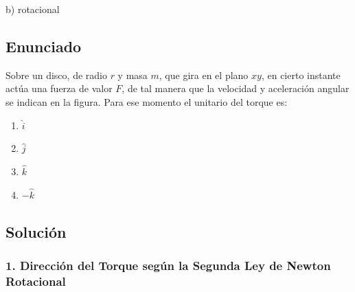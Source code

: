 \documentclass[12pt, a4paper]{article}
\begin{document}
\begin{tcolorbox}[colback=green!5!white, colframe=green!50!black, title=Respuesta Final]
\centering \Large b) rotacional
\end{tcolorbox}

\newpage

\subsection*{Enunciado}
Sobre un disco, de radio $r$ y masa $m$, que gira en el plano $xy$, en cierto instante actúa una fuerza de valor $F$, de tal manera que la velocidad y aceleración angular se indican en la figura. Para ese momento el unitario del torque es:

\begin{center}
\end{center}

\begin{enumerate}[label=\alph*)]
    \item $\hat{i}$
    \item $\hat{j}$
    \item $\hat{k}$
    \item $-\hat{k}$
\end{enumerate}

\subsection*{Solución}

\subsubsection*{1. Dirección del Torque según la Segunda Ley de Newton Rotacional}
\end{document}
